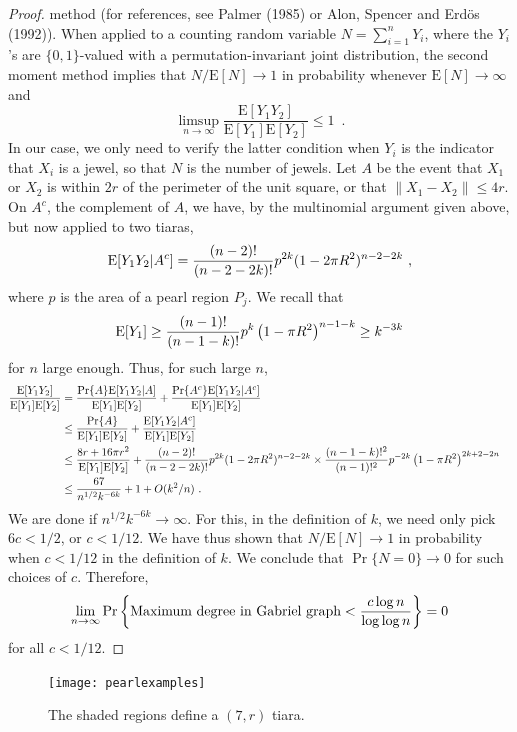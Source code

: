 \documentclass[lotsofwhite,charterfonts]{patmorin}
\newcommand{\PROB}{\Pr}
\newcommand{\EXP}{\mathrm{E}}
\begin{document}
\begin{proof}
method (for references, see Palmer (1985) or
Alon, Spencer and Erd\"os (1992)). When
applied to a counting random variable $N = \sum_{i=1}^n Y_i$,
where the $Y_i$'s are $\{ 0,1 \}$-valued with
a permutation-invariant joint distribution,
the second moment method implies that
$N/\EXP[N] \to 1$ in probability whenever
$\EXP[N]\to \infty$ and
\[
\limsup_{n\to\infty} \frac{\EXP[Y_1 Y_2]}{\EXP[Y_1]\EXP[Y_2]} \le 1 \enspace .
\]
In our case, we only need to verify the latter
condition when $Y_i$ is the indicator that
$X_i$ is a jewel, so that $N$ is the number of jewels.
Let $A$ be the event that $X_1$ or $X_2$ is within
$2r$ of the perimeter of the unit square, or that
$\| X_1 - X_2 \| \le 4r$.
On $A^c$, the complement of $A$, we have, by
the multinomial argument given above, but now
applied to two tiaras,
\[
\EXP[Y_1 Y_2 | A^c]
= { (n-2)! \over (n-2-2k)! } p^{2k} (1-2\pi R^2)^{n-2-2k}~,
\]
where $p$ is the area of a pearl region $P_j$.
We recall that
\[
\EXP[Y_1]\ge
{(n-1)! \over (n-1-k)!} p^k \left( 1 - \pi R^2 \right)^{n-1-k}
\ge k^{-3k}
\]
for $n$ large enough.
Thus, for such large $n$,
\[
\begin{aligned}
{\EXP[Y_1 Y_2] \over \EXP[Y_1]\EXP[Y_2]} 
&=
{\PROB\{A\}\EXP[Y_1 Y_2 |A ] \over \EXP[Y_1]\EXP[Y_2]}
+ {\PROB\{A^c\}\EXP [ Y_1 Y_2 | {A^c} ] \over \EXP[Y_1]\EXP[Y_2]} \cr
&\le
{\PROB \{ A \} \over \EXP[Y_1]\EXP[Y_2]}
+ {\EXP [ Y_1 Y_2 | A^c ] \over \EXP[Y_1]\EXP[Y_2]} \cr
&\le
{8r + 16 \pi r^2 \over \EXP[Y_1]\EXP[Y_2]}
+ { (n-2)! \over (n-2-2k)! } p^{2k} (1-2\pi R^2)^{n-2-2k}\times
{(n-1-k)!^2 \over (n-1)!^2} p^{-2k} \left( 1 - \pi R^2 \right)^{2k+2-2n} \cr
&\le
{67 \over n^{1/2} k^{-6k}} + 1 + O(k^2/n) ~. \cr
\end{aligned}
\]
We are done if $n^{1/2} k^{-6k} \to \infty$. For this,
in the definition of $k$, we need only pick
$6c < 1/2$, or $c < 1/12$.
We have thus shown that $N/\EXP[N]\to 1$ in probability
when $c < 1/12$ in the definition of $k$.
We conclude that
$\PROB \{ N = 0 \}  \to 0$ for such choices of $c$.
Therefore,
\[
\lim_{n\to\infty}
\PROB \left\{ \hbox{\rm Maximum degree in Gabriel graph}
	   < {c \log n \over \log \log n } \right\}
	   = 0
\]
for all $c < 1/12$.
\end{proof}


\begin{figure}
\begin{center}{\texttt{[image: pearlexamples]}}\end{center}
\caption{The shaded regions define a $(7,r)$ tiara.}
\end{figure}
\end{document}
